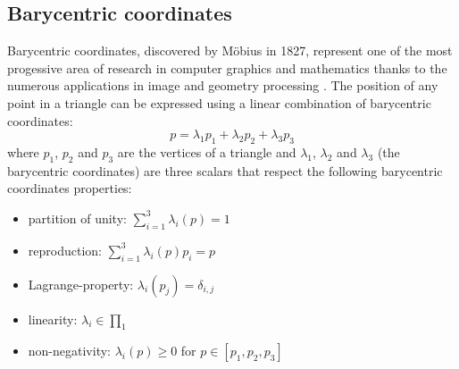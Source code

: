 \subsection{Barycentric coordinates}\label{section:barycentric-coord}
Barycentric coordinates, discovered by M\"obius in 1827, represent one of the most progessive area of research in computer graphics and mathematics thanks to the numerous applications in image and geometry processing \cite{REPORT:localbarycentricoordsepfl}.
The position of any point in a triangle can be expressed using a linear combination of barycentric coordinates:
$$ p = \lambda_1 p_1 + \lambda_2 p_2 + \lambda_3 p_3$$
where $p_1$, $p_2$ and $p_3$ are the vertices of a triangle and $\lambda_1$, $\lambda_2$ and $\lambda_3$ (the barycentric coordinates) are three scalars that
respect the following barycentric coordinates properties:
\begin{itemize}
  \item partition of unity: $\sum_{i=1}^3 \lambda_{i}(p) = 1$
  \item reproduction: $\sum_{i=1}^3 \lambda_{i}(p)p_i = p$
  \item Lagrange-property: $\lambda_i(p_j) = \delta_{i, j}$
  \item linearity: $\lambda_i \in \prod_1$
  \item non-negativity: $\lambda_i(p)\geq 0$ for $p \in [p_1, p_2, p_3]$
\end{itemize}

